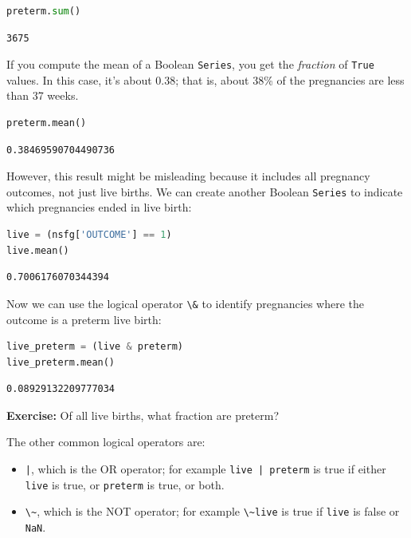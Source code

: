 \begin{lstlisting}[language=Python,style=source]
preterm.sum()
\end{lstlisting}

\begin{lstlisting}[style=output]
3675
\end{lstlisting}

If you compute the mean of a Boolean \passthrough{\lstinline!Series!},
you get the \emph{fraction} of \passthrough{\lstinline!True!} values. In
this case, it's about 0.38; that is, about 38\% of the pregnancies are
less than 37 weeks.

\begin{lstlisting}[language=Python,style=source]
preterm.mean()
\end{lstlisting}

\begin{lstlisting}[style=output]
0.38469590704490736
\end{lstlisting}

However, this result might be misleading because it includes all
pregnancy outcomes, not just live births. We can create another Boolean
\passthrough{\lstinline!Series!} to indicate which pregnancies ended in
live birth:

\begin{lstlisting}[language=Python,style=source]
live = (nsfg['OUTCOME'] == 1)
live.mean()
\end{lstlisting}

\begin{lstlisting}[style=output]
0.7006176070344394
\end{lstlisting}

Now we can use the logical operator \passthrough{\lstinline!\&!} to
identify pregnancies where the outcome is a preterm live birth:

\begin{lstlisting}[language=Python,style=source]
live_preterm = (live & preterm)
live_preterm.mean()
\end{lstlisting}

\begin{lstlisting}[style=output]
0.08929132209777034
\end{lstlisting}

\textbf{Exercise:} Of all live births, what fraction are preterm?

The other common logical operators are:

\begin{itemize}
\item
  \passthrough{\lstinline!|!}, which is the OR operator; for example
  \passthrough{\lstinline!live | preterm!} is true if either
  \passthrough{\lstinline!live!} is true, or
  \passthrough{\lstinline!preterm!} is true, or both.
\item
  \passthrough{\lstinline!\~!}, which is the NOT operator; for example
  \passthrough{\lstinline!\~live!} is true if
  \passthrough{\lstinline!live!} is false or
  \passthrough{\lstinline!NaN!}.
\end{itemize}

